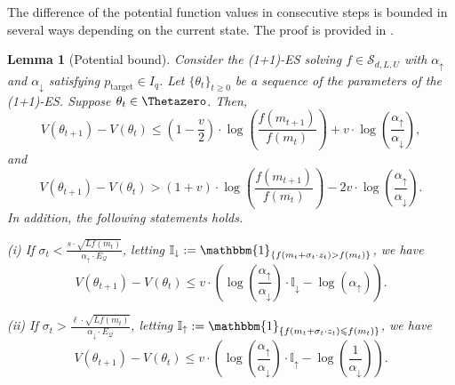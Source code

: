 \documentclass[journal]{IEEEtran}
\providecommand{\ind}[1]{\ensuremath{\mathbbm{1}_{\left\{#1\right\}}}} %
\renewcommand{\geq}{\geqslant} %
\renewcommand{\leq}{\leqslant} %
\newtheorem{lemma}[theorem]{Lemma}
\theoremstyle{definition}
\newcommand{\markupdraft}[2]{%
\ifthenelse{\equal{#1}{display}}{#2}{}%
\ifthenelse{\equal{#1}{color}}{\color{#2}}{}%
}
\newcommand{\todo}[2][]{\markupdraft{display}{{\color{red}\noindent++TODO: #2 {\color{yellow}(#1)}++}}}
\newcommand{\yohe}[1]{{\color{cyan}Y.A.: #1}}
\newcommand{\mori}[1]{{\color[rgb]{0.22, 0.71, 0.55} MORINAGA :  #1}}
\newcommand{\indup}{\mathbb{I}_{\uparrow}}
\newcommand{\inddown}{\mathbb{I}_{\downarrow}}
\newcommand{\aup}{\alpha_{\uparrow}}
\newcommand{\adown}{\alpha_{\downarrow}}
\begin{document}
The difference of the potential function values in consecutive steps is bounded in several ways depending on the current state. 
The proof is provided in .
\begin{lemma}[Potential bound]\label{lemma:potential_decrease}
Consider the (1+1)-ES solving $f \in \mathcal{S}_{d,L,U}$ with $\aup$ and $\adown$ satisfying $p_\mathrm{target} \in I_q$. Let $\{\theta_t\}_{t\geq 0}$ be a sequence of the parameters of the (1+1)-ES.
Suppose $\theta_t\in\Thetazero$. 
Then,
\begin{equation}
V(\theta_{t+1}) - V(\theta_t)\leq 
\left(1-\frac{v}{2}\right)
\cdot \log\left(\frac{f(m_{t+1})}{f(m_t)}\right) + v\cdot\log\left(\frac{\aup}{\adown}\right)
,
\label{eq:general_potential_decrease}
\end{equation}
and
\begin{equation}
V(\theta_{t+1}) - V(\theta_t)
>
\left(1+v\right)\cdot\log\left(\frac{f(m_{t+1})}{f(m_t)}\right)
-2v\cdot\log\left(\frac{\aup}{\adown}\right)
.
\label{eq:constant_lower_bound_of_V}
\end{equation}
In addition, the following statements holds.

(i) If $\sigma_t < \frac{s \cdot \sqrt{ L f(m_t) }}{ \aup\cdot E_\mathcal{Q}}$, letting $\inddown := \ind{f(m_t + \sigma_t\cdot z_t) > f(m_t)}$, we have
\begin{equation}
V(\theta_{t+1}) - V(\theta_t) \leq
v \cdot\left( \log\left(\frac{\aup}{\adown}\right)\cdot\inddown - \log(\aup)\right)
.
\label{eq:small_sigma_potential_decrease}
\end{equation}

(ii) If $\sigma_t > \frac{\ell \cdot \sqrt{L f(m_t)} }{ \adown\cdot E_\mathcal{Q}}$, letting $\indup := \ind{f(m_t + \sigma_t\cdot z_t) \leq f(m_t)}$, we have
\begin{equation}
V(\theta_{t+1}) - V(\theta_t)\leq 
v \cdot\left( \log\left(\frac{\aup}{\adown}\right)\cdot\indup - \log\left(\frac{1}{\adown}\right)\right)
.
\label{eq:large_sigma_potential_decrease}
\end{equation}
\end{lemma}
\end{document}
